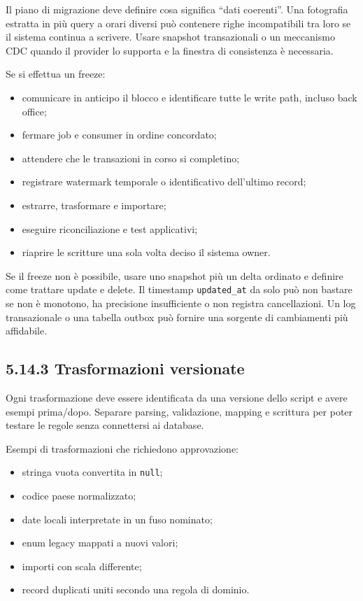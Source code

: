 \documentclass[
  italian,
  10pt,
]{book}
\providecommand{\tightlist}{%
  \setlength{\itemsep}{0pt}\setlength{\parskip}{0pt}}
\begin{document}
Il piano di migrazione deve definire cosa significa ``dati coerenti''.
Una fotografia estratta in più query a orari diversi può contenere righe
incompatibili tra loro se il sistema continua a scrivere. Usare snapshot
transazionali o un meccanismo CDC quando il provider lo supporta e la
finestra di consistenza è necessaria.

Se si effettua un freeze:

\begin{itemize}
\tightlist
\item
  comunicare in anticipo il blocco e identificare tutte le write path,
  incluso back office;
\item
  fermare job e consumer in ordine concordato;
\item
  attendere che le transazioni in corso si completino;
\item
  registrare watermark temporale o identificativo dell'ultimo record;
\item
  estrarre, trasformare e importare;
\item
  eseguire riconciliazione e test applicativi;
\item
  riaprire le scritture una sola volta deciso il sistema owner.
\end{itemize}

Se il freeze non è possibile, usare uno snapshot più un delta ordinato e
definire come trattare update e delete. Il timestamp
\texttt{updated\_at} da solo può non bastare se non è monotono, ha
precisione insufficiente o non registra cancellazioni. Un log
transazionale o una tabella outbox può fornire una sorgente di
cambiamenti più affidabile.

\subsection{5.14.3 Trasformazioni
versionate}\label{trasformazioni-versionate}

Ogni trasformazione deve essere identificata da una versione dello
script e avere esempi prima/dopo. Separare parsing, validazione, mapping
e scrittura per poter testare le regole senza connettersi ai database.

Esempi di trasformazioni che richiedono approvazione:

\begin{itemize}
\tightlist
\item
  stringa vuota convertita in \texttt{null};
\item
  codice paese normalizzato;
\item
  date locali interpretate in un fuso nominato;
\item
  enum legacy mappati a nuovi valori;
\item
  importi con scala differente;
\item
  record duplicati uniti secondo una regola di dominio.
\end{itemize}
\end{document}
